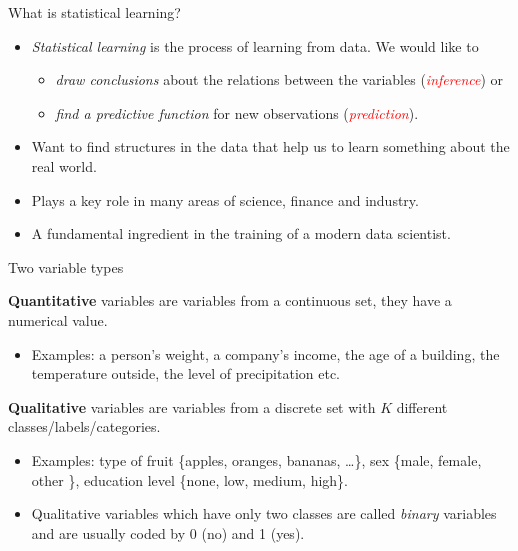 \documentclass[ignorenonframetext,]{beamer}
\providecommand{\tightlist}{%
  \setlength{\itemsep}{0pt}\setlength{\parskip}{0pt}}
\begin{document}
\begin{frame}{What is statistical learning?}
\protect\hypertarget{what-is-statistical-learning}{}

\begin{itemize}
\item
  \emph{Statistical learning} is the process of learning from data. We
  would like to

  \begin{itemize}
  \tightlist
  \item
    \emph{draw conclusions} about the relations between the variables
    (\emph{\textcolor{red}{inference}}) or
  \item
    \emph{find a predictive function} for new observations
    (\emph{\textcolor{red}{prediction}}).
  \end{itemize}
\item
  Want to find structures in the data that help us to learn something
  about the real world.
\item
  Plays a key role in many areas of science, finance and industry.
\item
  A fundamental ingredient in the training of a modern data scientist.
\end{itemize}

\end{frame}

\begin{frame}

\begin{block}{Two variable types}

\vspace{2mm}

\textbf{Quantitative} variables are variables from a continuous set,
they have a numerical value.

\begin{itemize}
\tightlist
\item
  Examples: a person's weight, a company's income, the age of a
  building, the temperature outside, the level of precipitation etc.
\end{itemize}

\vspace{4mm}

\textbf{Qualitative} variables are variables from a discrete set with
\(K\) different classes/labels/categories.

\begin{itemize}
\item
  Examples: type of fruit \{apples, oranges, bananas, \ldots{}\}, sex
  \{male, female, other \}, education level \{none, low, medium, high\}.
\item
  Qualitative variables which have only two classes are called
  \emph{binary} variables and are usually coded by 0 (no) and 1 (yes).
\end{itemize}

\end{block}

\end{frame}
\end{document}
